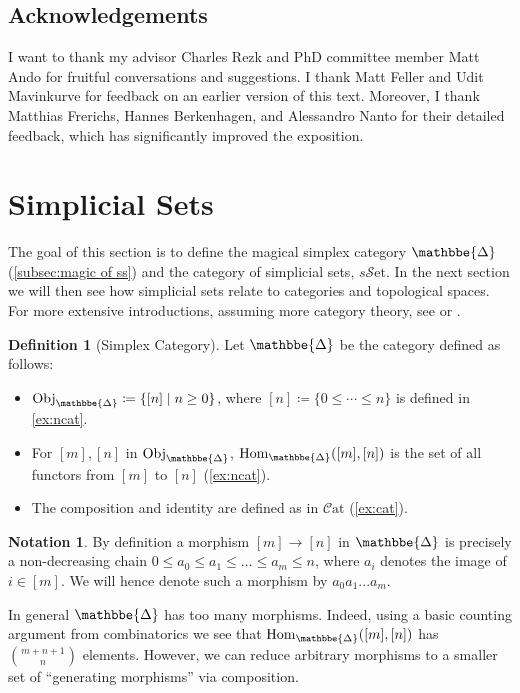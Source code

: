 \documentclass[11pt, a4paper]{amsart}
\def\DDelta{{\mathbbe{\Delta}}}
\newcommand{\DD}{\DDelta}
\newcommand{\Hom}{\mathrm{Hom}}
\newcommand{\sSet}{s\mathscr{S}\mathrm{et}}
\newcommand{\Cat}{\mathscr{C}\mathrm{at}}
\newcommand{\Obj}{\mathrm{Obj}}
\theoremstyle{definition}
\newtheorem{definition}[equation]{Definition}
\newtheorem{notation}[equation]{Notation}
\theoremstyle{remark}
\numberwithin{equation}{section}
\begin{document}
\subsection{Acknowledgements} 
I want to thank my advisor Charles Rezk and PhD committee member Matt Ando for fruitful conversations and suggestions. I thank Matt Feller and Udit Mavinkurve for feedback on an earlier version of this text. Moreover, I thank Matthias Frerichs, Hannes Berkenhagen, and Alessandro Nanto for their detailed feedback, which has significantly improved the exposition.


\section{Simplicial Sets} \label{sec:ss}
The goal of this section is to define the magical simplex category $\DD$ (\cref{subsec:magic of ss}) and the category of simplicial sets, $\sSet$. In the next section we will then see how simplicial sets relate to categories and topological spaces. For more extensive introductions, assuming more category theory, see \cite{riehl2011leisurely,friedman2012elementarysimplicialsets} or \cite[Section I.1]{goerssjardine2009simplicialhomotopytheory}.

\begin{definition}[Simplex Category] \label{def:delta}
  Let $\DD$ be the category defined as follows:
  \begin{itemize}
    \item $\Obj_{\DD} \coloneq \{ [n] \mid n \geq 0 \}$, where $[n] \coloneq \{0 \leq \cdots \leq n\}$ is defined in \cref{ex:ncat}.
    \item For $[m],[n]$ in $\Obj_{\DD}$, $\Hom_{\DD}([m],[n])$ is the set of all functors from $[m]$ to $[n]$ (\cref{ex:ncat}).
    \item The composition and identity are defined as in $\Cat$ (\cref{ex:cat}).
  \end{itemize} 
\end{definition}

\begin{notation} \label{not:delta morphism}
 By definition a morphism $[m] \to [n]$ in $\DD$ is precisely a non-decreasing chain $0 \leq a_0 \leq a_1 \leq \dots \leq a_m \leq n$, where $a_i$ denotes the image of $i \in [m]$. We will hence denote such a morphism by $a_0 a_1 ... a_m$.
\end{notation}

In general $\DD$ has too many morphisms. Indeed, using a basic counting argument from combinatorics we see that $\Hom_{\DD}([m],[n])$ has $\binom{m+n+1}{n}$ elements. However, we can reduce arbitrary morphisms to a smaller set of ``generating morphisms'' via composition.
\end{document}
